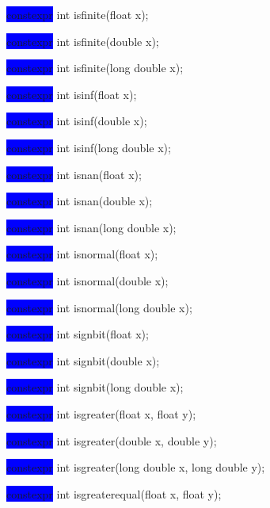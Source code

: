 \documentclass[prd,twocolumn,amsmath,amssymb,nofootinbib,eqsecnum]{revtex4-1}
\newcommand{\oldhighlight}[1]{\colorbox{blue}{\!\!\!\! #1}}
\begin{document}
{\oldhighlight{constexpr} int isfinite(float x);

\oldhighlight{constexpr} int isfinite(double x);

\oldhighlight{constexpr} int isfinite(long double x);

\vspace{2ex}


\oldhighlight{constexpr} int isinf(float x);

\oldhighlight{constexpr} int isinf(double x);

\oldhighlight{constexpr} int isinf(long double x);

\vspace{2ex}


\oldhighlight{constexpr} int isnan(float x);

\oldhighlight{constexpr} int isnan(double x);

\oldhighlight{constexpr} int isnan(long double x);

\vspace{2ex}


\oldhighlight{constexpr} int isnormal(float x);

\oldhighlight{constexpr} int isnormal(double x);

\oldhighlight{constexpr} int isnormal(long double x);

\vspace{2ex}


\oldhighlight{constexpr} int signbit(float x);

\oldhighlight{constexpr} int signbit(double x);

\oldhighlight{constexpr} int signbit(long double x);

\vspace{2ex}


\oldhighlight{constexpr} int isgreater(float x, float y);

\oldhighlight{constexpr} int isgreater(double x, double y);

\oldhighlight{constexpr} int isgreater(long double x, long double y);

\vspace{2ex}


\oldhighlight{constexpr} int isgreaterequal(float x, float y);

}
\end{document}
